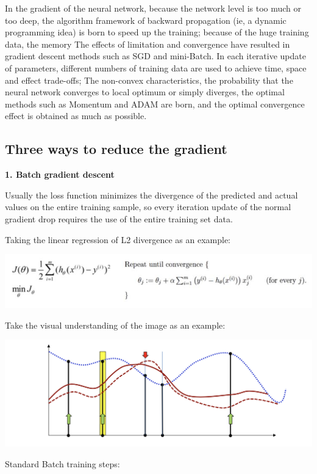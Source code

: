 \documentclass{article}
\begin{document}
	In the gradient of the neural network, because the network level is too much or too deep, the algorithm framework of backward propagation (ie, a dynamic programming idea) is born to speed up the training; because of the huge training data, the memory The effects of limitation and convergence have resulted in gradient descent methods such as SGD and mini-Batch. In each iterative update of parameters, different numbers of training data are used to achieve time, space and effect trade-offs; The non-convex characteristics, the probability that the neural network converges to local optimum or simply diverges, the optimal methods such as Momentum and ADAM are born, and the optimal convergence effect is obtained as much as possible.
	
	\subsection{Three ways to reduce the gradient}
	
	\textbf{1. Batch gradient descent}
	
	Usually the loss function minimizes the divergence of the predicted and actual values on the entire training sample, so every iteration update of the normal gradient drop requires the use of the entire training set data.
	
	Taking the linear regression of L2 divergence as an example:
	
	\includegraphics[scale=0.4]{82.png}
	
	Take the visual understanding of the image as an example:
	
	
	\includegraphics[scale=0.2]{83.png}
	
	Standard Batch training steps:
	
\end{document}
